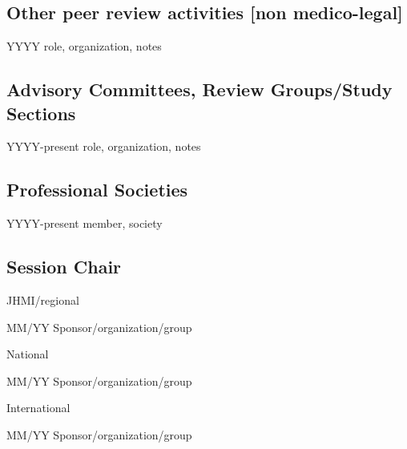 \documentclass[11pt]{article}
\newenvironment{lyxlist}[1]
	{\begin{list}{}
		{\setlength\itemsep{-0.5ex}
		\settowidth{\labelwidth}{#1}
		 \setlength{\leftmargin}{\labelwidth}
		 \addtolength{\leftmargin}{\labelsep}
		 \renewcommand{\makelabel}[1]{##1\hfil}}}
	{\end{list}}
\begin{document}
\subsection*{Other peer review activities [non medico-legal]}
\begin{lyxlist}{JHMI/regional}
\item[{YYYY}]role, organization, notes
\end{lyxlist}
	
\subsection*{Advisory Committees, Review Groups/Study Sections}
\begin{lyxlist}{JHMI/regional}
\item[{YYYY-present}]role, organization, notes

\end{lyxlist}


\subsection*{Professional Societies}

\begin{lyxlist}{JHMI/regional}
\item[{YYYY-present}]member, society

\end{lyxlist}

\subsection*{Session Chair}
\begin{lyxlist}{JHMI/regional}
\item[{\textcolor{color1}{JHMI/regional}}]

\item[{MM/YY}]Sponsor/organization/group

\item[{\textcolor{color1}{National}}]

\item[{MM/YY}]Sponsor/organization/group

\item[{\textcolor{color1}{International}}]

\item[{MM/YY}]Sponsor/organization/group


\end{lyxlist}
\end{document}
